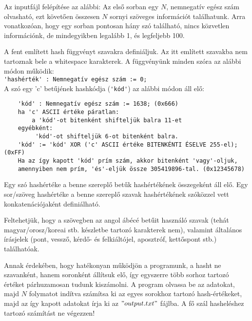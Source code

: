 \documentclass[12pt]{article}
\begin{document}
Az inputfájl felépítése az alábbi: Az első sorban egy $N$, nemnegatív egész szám olvasható, ezt követően összesen $N$ sornyi szöveges információt találhatunk. Arra vonatkozóan, hogy egy sorban pontosan hány szó található, nincs közvetlen információnk, de mindegyikben legalább 1, és legfeljebb 100.

A fent említett hash függvényt szavakra definiáljuk. Az itt említett szavakba nem tartoznak bele a whitespace karakterek. A függvényünk minden szóra az alábbi módon működik:\\

 \verb|'hashérték' : Nemnegatív egész szám := 0;| \\

A szó egy 'c' betűjének hashkódja (\verb|'kód'|) az alábbi módon áll elő:

\begin{verbatim}
    'kód' : Nemnegatív egész szám := 1638; (0x666)
    ha 'c' ASCII értéke páratlan:
        a 'kód'-ot bitenként shifteljük balra 11-et
    egyébként:
         'kód'-ot shifteljük 6-ot bitenként balra.
    'kód' := 'kód' XOR ('c' ASCII értéke BITENKÉNTI ÉSELVE 255-el); (0xFF)
    Ha az így kapott 'kód' prím szám, akkor bitenként 'vagy'-oljuk,
    amennyiben nem prím, 'és'-eljük össze 305419896-tal. (0x12345678)
\end{verbatim}

Egy szó hashértéke a benne szereplő betűk hashértékének összegeként áll elő. Egy sor/szöveg hashértéke a benne szereplő szavak hashértékének szóközzel vett konkatenációjaként definiálható.

Feltehetjük, hogy a szövegben az angol ábécé betűit használó szavak (tehát magyar/orosz/koreai stb. készletbe tartozó karakterek nem), valamint általános írásjelek (pont, vessző, kérdő- és felkiáltójel, aposztróf, kettőspont stb.) találhatóak.

Annak érdekében, hogy hatékonyan működjön a programunk, a hasht ne szavanként, hanem soronként állítsuk elő, így egyszerre több sorhoz tartozó értéket párhuzamosan tudunk kiszámolni. A program olvassa be az adatokat, majd $N$ folymatot indítva számítsa ki az egyes sorokhoz tartozó hash-értékeket, majd az így kapott adatokat írja ki az $"output.txt"$ fájlba. A fő szál hasheléshez tartozó számítást ne végezzen!\\
\end{document}
